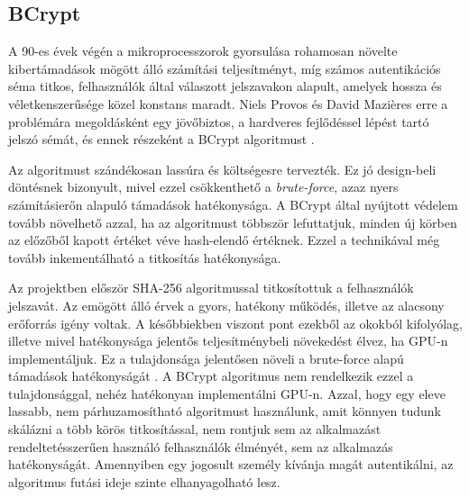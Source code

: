 \subsection{BCrypt}

A 90-es évek végén a mikroprocesszorok gyorsulása rohamosan növelte kibertámadások mögött álló számítási teljesítményt, míg számos autentikációs séma titkos, felhasználók által válaszott jelszavakon alapult, amelyek hossza és véletkenszerűsége közel konstans maradt. Niels Provos és David Mazières erre a problémára megoldásként egy jövőbiztos, a hardveres fejlődéssel lépést tartó jelszó sémát, és ennek részeként a BCrypt algoritmust \cite{provos1999future}. \par

Az algoritmust szándékosan lassúra és költségesre tervezték. Ez jó design-beli döntésnek bizonyult, mivel ezzel csökkenthető a \emph{brute-force}, azaz nyers számításierőn alapuló támadások hatékonysága. A BCrypt által nyújtott védelem tovább növelhető azzal, ha az algoritmust többször lefuttatjuk, minden új körben az előzőből kapott értéket véve hash-elendő értéknek. Ezzel a technikával még tovább inkementálható a titkosítás hatékonysága. \par

Az projektben először SHA-256 algoritmussal titkosítottuk a felhasználók jelszavát. Az emögött álló érvek a gyors, hatékony működés, illetve az alacsony erőforrás igény voltak. A későbbiekben viszont pont ezekből az okokból kifolyólag, illetve mivel hatékonysága jelentős teljesítménybeli növekedést élvez, ha GPU-n implementáljuk. Ez a tulajdonsága jelentősen növeli a brute-force alapú támadások hatékonyságát \cite{patra2021cryptography}. A BCrypt algoritmus nem rendelkezik ezzel a tulajdonsággal, nehéz hatékonyan implementálni GPU-n. Azzal, hogy egy eleve lassabb, nem párhuzamosítható algoritmust használunk, amit könnyen tudunk skálázni a több körös titkosítással, nem rontjuk sem az alkalmazást rendeltetésszerűen használó felhasználók élményét, sem az alkalmazás hatékonyságát. Amennyiben egy jogosult személy kívánja magát autentikálni, az algoritmus futási ideje szinte elhanyagolható lesz. \par